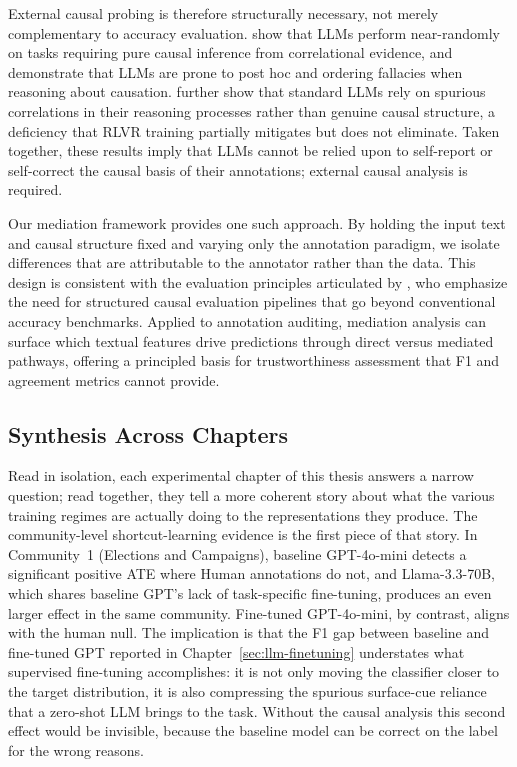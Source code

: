 External causal probing is therefore structurally necessary, not merely complementary to accuracy evaluation. \citet{jin2024largelanguagemodelsinfer} show that LLMs perform near-randomly on tasks requiring pure causal inference from correlational evidence, and \citet{joshi-etal-2024-llms} demonstrate that LLMs are prone to post hoc and ordering fallacies when reasoning about causation. \citet{fu2025correlationcausationanalyzingcausal} further show that standard LLMs rely on spurious correlations in their reasoning processes rather than genuine causal structure, a deficiency that RLVR training partially mitigates but does not eliminate. Taken together, these results imply that LLMs cannot be relied upon to self-report or self-correct the causal basis of their annotations; external causal analysis is required.

Our mediation framework provides one such approach. By holding the input text and causal structure fixed and varying only the annotation paradigm, we isolate differences that are attributable to the annotator rather than the data. This design is consistent with the evaluation principles articulated by \citet{cheng2022evaluation}, who emphasize the need for structured causal evaluation pipelines that go beyond conventional accuracy benchmarks. Applied to annotation auditing, mediation analysis can surface which textual features drive predictions through direct versus mediated pathways, offering a principled basis for trustworthiness assessment that F1 and agreement metrics cannot provide.

\subsection{Synthesis Across Chapters}
\label{sec:cross-chapter-synthesis}

Read in isolation, each experimental chapter of this thesis answers a narrow question; read together, they tell a more coherent story about what the various training regimes are actually doing to the representations they produce. The community-level shortcut-learning evidence is the first piece of that story. In Community~1 (Elections and Campaigns), baseline GPT-4o-mini detects a significant positive ATE where Human annotations do not, and Llama-3.3-70B, which shares baseline GPT's lack of task-specific fine-tuning, produces an even larger effect in the same community. Fine-tuned GPT-4o-mini, by contrast, aligns with the human null. The implication is that the F1 gap between baseline and fine-tuned GPT reported in Chapter~\ref{sec:llm-finetuning} understates what supervised fine-tuning accomplishes: it is not only moving the classifier closer to the target distribution, it is also compressing the spurious surface-cue reliance that a zero-shot LLM brings to the task. Without the causal analysis this second effect would be invisible, because the baseline model can be correct on the label for the wrong reasons.

